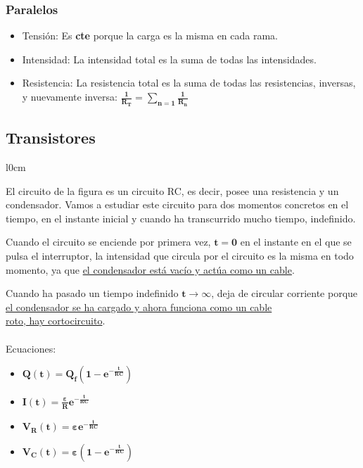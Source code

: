 \subsubsection{Paralelos}
\begin{itemize}
        \item Tensión: Es \textbf{cte} porque la carga es la misma en cada rama.
        \item Intensidad: La intensidad total es la suma de todas las intensidades.
        \item Resistencia: La resistencia total es la suma de todas las resistencias, inversas, y nuevamente inversa: \(\bm{\frac{1}{R_T} = \sum_{n = 1}\frac{1}{R_n}}\)
\end{itemize}
\subsection{Transistores}
\begin{wrapfigure}{l}{0cm}
\end{wrapfigure}
\noindent El circuito de la figura es un circuito RC, es decir, posee una resistencia y un condensador.
Vamos a estudiar este circuito para dos momentos concretos en el tiempo, en el instante inicial y cuando ha transcurrido mucho tiempo, indefinido.
\vspace{.5cm}
\par \noindent Cuando el circuito se enciende por primera vez, \(\bm{t = 0}\) en el instante en el que se pulsa el interruptor, la intensidad que circula por el circuito es la misma en todo momento, ya que \underline{el condensador está vacío y actúa como un cable}.
\vspace{.5cm}
\par \hspace{-0.5cm}Cuando ha pasado un tiempo indefinido \(\bm{t \rightarrow \infty}\), deja de circular corriente porque \underline{el condensador se ha cargado y ahora funciona como un cable}\\
\underline{roto, hay cortocircuito}.
\\
\\
\noindent Ecuaciones:
\begin{itemize}
        \item \(\bm{Q(t)=Q_f(1-e^{-\frac{t}{RC}})}\)
        \item \(\bm{I(t)=\frac{\varepsilon}{R}e^{-\frac{t}{RC}}}\)
        \item \(\bm{V_R(t) = \varepsilon e^{-\frac{t}{RC}}}\)
        \item \(\bm{V_C(t) = \varepsilon(1-e^{-\frac{t}{RC}})}\)
\end{itemize}
